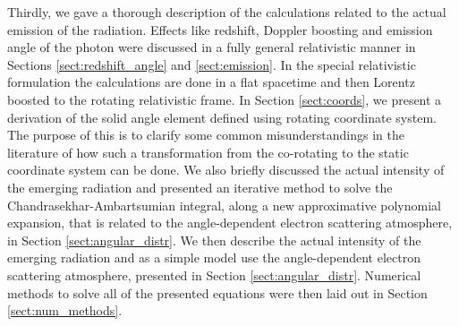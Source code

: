 \documentclass{aa}
\newcommand{\refe}[1]{#1}
\newcommand{\refedel}[1]{}
\newcommand{\sch}{Schwarzschild }
\newcommand{\lgamma}{\gamma_{\text{L}}}
\begin{document}
Thirdly, we gave a thorough description of the calculations related to the actual emission of the radiation.
Effects like redshift, Doppler boosting and emission angle of the photon were discussed in a fully general relativistic manner in Sections \ref{sect:redshift_angle} and \ref{sect:emission}. 
\refedel{,hence also verifying the previous ad-hoc special relativistic formulations}%
In the special relativistic formulation \citep[see e.g.,][]{PB06} the calculations are done in a flat spacetime and then Lorentz boosted to the rotating relativistic frame.
\refe{In Section \ref{sect:coords}, we present a derivation of the solid angle element defined using rotating coordinate system.}
\refe{The purpose of this is to clarify some common misunderstandings in the literature of how such a transformation from the co-rotating to the static coordinate system can be done.}
We also briefly discussed the actual intensity of the emerging radiation and \refe{presented} an iterative method to solve the Chandrasekhar-Ambartsumian integral, along a new approximative polynomial expansion, that is related to the angle-dependent electron scattering atmosphere, in Section \ref{sect:angular_distr}.
We then describe the actual intensity of the emerging radiation and as a simple model use the angle-dependent electron scattering atmosphere, presented in Section \ref{sect:angular_distr}.
Numerical methods to solve all of the presented equations were then laid out in Section \ref{sect:num_methods}.
\end{document}
